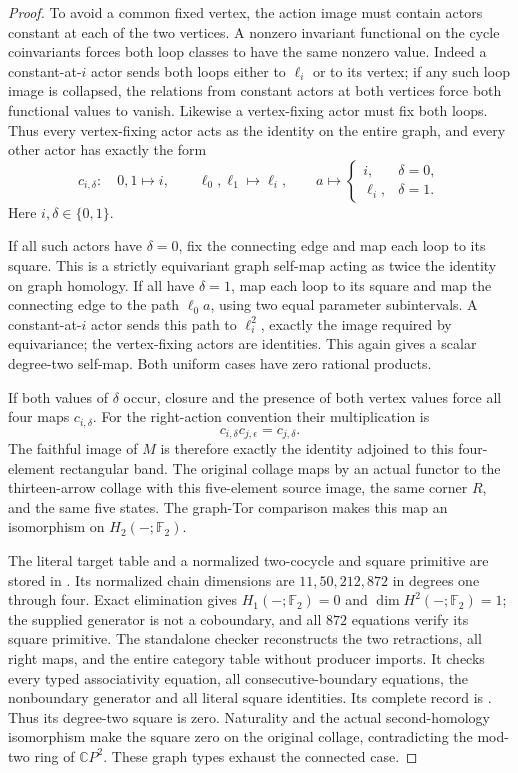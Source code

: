 \begin{proof}
To avoid a common fixed vertex, the action image must contain
actors constant at each of the two vertices. A nonzero invariant
functional on the cycle coinvariants forces both loop classes
to have the same nonzero value. Indeed a constant-at-$i$ actor
sends both loops either to $\ell_i$ or to its vertex; if any
such loop image is collapsed, the relations from constant actors
at both vertices force both functional values to vanish.
Likewise a vertex-fixing actor must fix both loops. Thus every
vertex-fixing actor acts as the identity on the entire graph,
and every other actor has exactly the form
\[
 c_{i,\delta}:\quad
 0,1\longmapsto i,\qquad
 \ell_0,\ell_1\longmapsto\ell_i,\qquad
 a\longmapsto
 \begin{cases}i,&\delta=0,\\\ell_i,&\delta=1.
 \end{cases}
\]
Here $i,\delta\in\{0,1\}$.

If all such actors have $\delta=0$, fix the connecting edge and
map each loop to its square. This is a strictly equivariant
graph self-map acting as twice the identity on graph homology.
If all have $\delta=1$, map each loop to its square and map the
connecting edge to the path $\ell_0a$, using two equal parameter
subintervals. A constant-at-$i$ actor sends this path to
$\ell_i^2$, exactly the image required by equivariance; the
vertex-fixing actors are identities. This again gives a scalar
degree-two self-map. Both uniform cases have zero rational products.

If both values of $\delta$ occur, closure and the presence of both
vertex values force all four maps $c_{i,\delta}$.
For the right-action convention their multiplication is
\[
 c_{i,\delta}c_{j,\epsilon}=c_{j,\delta}.
\]
The faithful image of $M$ is therefore exactly the identity
adjoined to this four-element rectangular band. The original
collage maps by an actual functor to the thirteen-arrow collage
with this five-element source image, the same corner $R$, and
the same five states. The graph-Tor comparison makes this
map an isomorphism on $H_2(-;\mathbb F_2)$.

The literal target table and a normalized two-cocycle and square
primitive are stored in
.
Its normalized chain dimensions are $11,50,212,872$ in degrees
one through four. Exact elimination gives $H_1(-;\mathbb F_2)=0$
and $\dim H^2(-;\mathbb F_2)=1$; the supplied generator is not
a coboundary, and all $872$ equations verify its square primitive.
The standalone checker 
reconstructs the two retractions, all right maps, and the entire
category table without producer imports. It checks every typed
associativity equation, all consecutive-boundary equations, the
nonboundary generator and all literal square identities. Its complete
record is
.
Thus its degree-two square is zero. Naturality and the actual
second-homology isomorphism make the square zero on the original
collage, contradicting the mod-two ring of $\mathbb CP^2$.
These graph types exhaust the connected case.
\end{proof}

